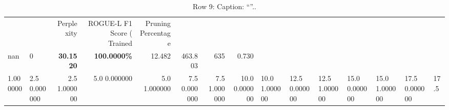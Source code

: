 \begin{table}
\caption{Row 9\ifshowcaption{}: Caption: ``''.\else.\fi}
\label{tab:evaluation-pipeline-9}
\begin{tabular}{llrrrrrr}
 &  & Perplexity & ROGUE-L F1 Score (%
Trained & Pruning Percentage &  &  &  &  &  &  \\
nan & 0 & \bfseries 30.1520 & \bfseries 100.0000\% & 12.482 & 463.803 & 635 & 0.730 \\
1.000000 & 2.5%
0.000000 & 2.5%
1.000000 & 5.0%
0.000000 & 5.0%
1.000000 & 7.5%
0.000000 & 7.5%
1.000000 & 10.0%
0.000000 & 10.0%
1.000000 & 12.5%
0.000000 & 12.5%
1.000000 & 15.0%
0.000000 & 15.0%
1.000000 & 17.5%
0.000000 & 17.5%

\end{tabular}
\end{table}
